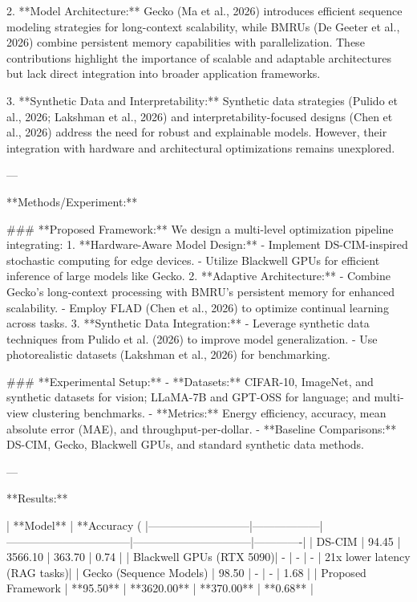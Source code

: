2. **Model Architecture:**  
    Gecko (Ma et al., 2026) introduces efficient sequence modeling strategies for long-context scalability, while BMRUs (De Geeter et al., 2026) combine persistent memory capabilities with parallelization. These contributions highlight the importance of scalable and adaptable architectures but lack direct integration into broader application frameworks.  

3. **Synthetic Data and Interpretability:**  
    Synthetic data strategies (Pulido et al., 2026; Lakshman et al., 2026) and interpretability-focused designs (Chen et al., 2026) address the need for robust and explainable models. However, their integration with hardware and architectural optimizations remains unexplored.  

---

**Methods/Experiment:**  

### **Proposed Framework:**  
We design a multi-level optimization pipeline integrating:  
1. **Hardware-Aware Model Design:**  
    - Implement DS-CIM-inspired stochastic computing for edge devices.  
    - Utilize Blackwell GPUs for efficient inference of large models like Gecko.  
2. **Adaptive Architecture:**  
    - Combine Gecko's long-context processing with BMRU's persistent memory for enhanced scalability.  
    - Employ FLAD (Chen et al., 2026) to optimize continual learning across tasks.  
3. **Synthetic Data Integration:**  
    - Leverage synthetic data techniques from Pulido et al. (2026) to improve model generalization.  
    - Use photorealistic datasets (Lakshman et al., 2026) for benchmarking.  

### **Experimental Setup:**  
- **Datasets:** CIFAR-10, ImageNet, and synthetic datasets for vision; LLaMA-7B and GPT-OSS for language; and multi-view clustering benchmarks.  
- **Metrics:** Energy efficiency, accuracy, mean absolute error (MAE), and throughput-per-dollar.  
- **Baseline Comparisons:** DS-CIM, Gecko, Blackwell GPUs, and standard synthetic data methods.  

---

**Results:**  

| **Model**                | **Accuracy (%
|---------------------------|------------------|---------------------------------|--------------------------------|-------------|  
| DS-CIM                   | 94.45           | 3566.10                        | 363.70                        | 0.74        |  
| Blackwell GPUs (RTX 5090)| -                | -                              | -                              | 21x lower latency (RAG tasks)|  
| Gecko (Sequence Models)  | 98.50           | -                              | -                              | 1.68        |  
| Proposed Framework       | **95.50**       | **3620.00**                    | **370.00**                    | **0.68**    |  

